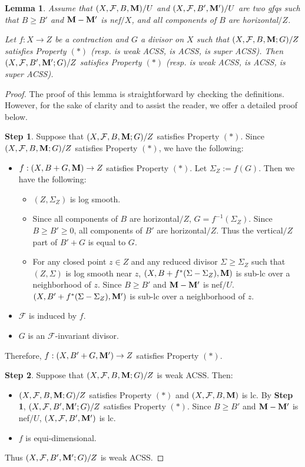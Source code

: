 \documentclass[11pt]{amsart}
\numberwithin{equation}{section}
\newcommand{\Mm}{{\bf{M}}}
\newcommand{\Ff}{\mathcal{F}}
\newtheorem{lem}[thm]{Lemma}
\theoremstyle{definition}
\theoremstyle{definition}
\theoremstyle{definition}
\begin{document}
\begin{lem}\label{lem: acss smaller coefficient}
Assume that $(X,\Ff,B,\Mm)/U$ and $(X,\Ff,B',\Mm')/U$ are two gfqs such that $B\geq B'$ and $\Mm-\Mm'$ is nef$/X$, and all components of $B$ are horizontal$/Z$.

Let $f: X\rightarrow Z$ be a contraction and $G$ a divisor on $X$ such that $(X,\Ff,B,\Mm;G)/Z$ satisfies Property $(*)$ (resp. is weak ACSS, is ACSS, is super ACSS). Then $(X,\Ff,B',\Mm';G)/Z$ satisfies Property $(*)$ (resp. is weak ACSS, is ACSS, is super ACSS). 
\end{lem}
\begin{proof}
The proof of this lemma is straightforward by checking the definitions. However, for the sake of clarity and to assist the reader, we offer a detailed proof below.

\medskip

\noindent\textbf{Step 1}. Suppose that $(X,\Ff,B,\Mm;G)/Z$ satisfies Property $(*)$. Since $(X,\Ff,B,\Mm;G)/Z$ satisfies Property $(*)$, we have the following:
\begin{itemize}
\item $f: (X,B+G,\Mm)\rightarrow Z$ satisfies Property $(*)$. Let $\Sigma_Z:=f(G)$. Then we have the following:
\begin{itemize}
    \item $(Z,\Sigma_Z)$ is log smooth.
    \item Since all components of $B$ are horizontal$/Z$, $G=f^{-1}(\Sigma_Z)$. Since $B\geq B'\geq 0$, all components of $B'$ are horizontal$/Z$. Thus the vertical$/Z$ part of $B'+G$ is equal to $G$.
    \item For any closed point $z\in Z$ and any reduced divisor $\Sigma\geq\Sigma_Z$ such that $(Z,\Sigma)$ is log smooth near $z$, $(X,B+f^*(\Sigma-\Sigma_Z),\Mm)$ is sub-lc over a neighborhood of $z$. Since $B\geq B'$ and $\Mm-\Mm'$ is nef$/U$. $(X,B'+f^*(\Sigma-\Sigma_Z),\Mm')$ is sub-lc over a neighborhood of $z$.
\end{itemize}
\item $\Ff$ is induced by $f$.
\item $G$ is an $\Ff$-invariant divisor.
\end{itemize}
Therefore, $f: (X,B'+G,\Mm')\rightarrow Z$ satisfies Property $(*)$.

\medskip

\noindent\textbf{Step 2}. Suppose that $(X,\Ff,B,\Mm;G)/Z$ is weak ACSS. Then:
\begin{itemize}
    \item $(X,\Ff,B,\Mm;G)/Z$ satisfies Property $(*)$ and $(X,\Ff,B,\Mm)$ is lc. By \textbf{Step 1}, $(X,\Ff,B',\Mm';G)/Z$ satisfies Property $(*)$. Since $B\geq B'$ and $\Mm-\Mm'$ is nef$/U$,  $(X,\Ff,B',\Mm')$ is lc. 
    \item $f$ is equi-dimensional.
\end{itemize}
Thus $(X,\Ff,B',\Mm';G)/Z$ is weak ACSS.


\end{proof}
\end{document}
